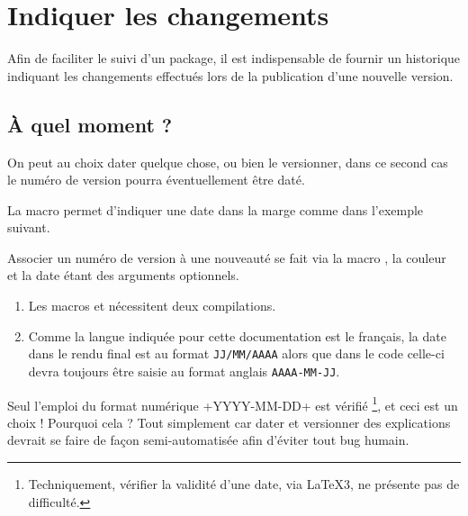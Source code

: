 \documentclass[10pt, a4paper]{article}
\begin{document}
\section{Indiquer les changements}

Afin de faciliter le suivi d'un package, il est indispensable de fournir un historique indiquant les changements effectués lors de la publication d'une nouvelle version.




\subsection{À quel moment ?}

On peut au choix dater quelque chose, ou bien le versionner, dans ce second cas le numéro de version pourra éventuellement être daté.




\begin{tdocexa}
    La macro  permet d'indiquer une date dans la marge comme dans l'exemple suivant.

\end{tdocexa}




\begin{tdocexa}
    Associer un numéro de version à une nouveauté se fait via la macro , la couleur et la date étant des arguments optionnels.

\end{tdocexa}


\begin{tdocimportant}
    \leavevmode

    \begin{enumerate}
        \item Les macros  et  nécessitent deux compilations.

        \item Comme la langue indiquée pour cette documentation est le français, la date dans le rendu final est au format \texttt{JJ/MM/AAAA} alors que dans le code celle-ci devra toujours être saisie au format anglais \texttt{AAAA-MM-JJ}.
    \end{enumerate}
\end{tdocimportant}


\begin{tdocwarn}
    Seul l'emploi du format numérique \tdocinlatex+YYYY-MM-DD+ est vérifié
    \footnote{
        Techniquement, vérifier la validité d'une date, via \LaTeX3, ne présente pas de difficulté.
    },
    et ceci est un choix ! Pourquoi cela ? Tout simplement car dater et versionner des explications devrait se faire de façon semi-automatisée afin d'éviter tout bug humain.
\end{tdocwarn}
\end{document}
